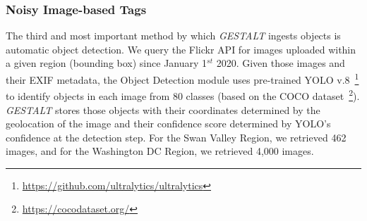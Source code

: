 \subsubsection{Noisy Image-based Tags}
The third and most important method by which \emph{GESTALT} ingests objects is automatic object detection.
We query the Flickr API for images uploaded within a given region (bounding box) since January 1$^{st}$ 2020. 
Given those images and their EXIF metadata, the Object Detection module uses pre-trained YOLO v.8~\footnote{\href{https://github.com/ultralytics/ultralytics}{https://github.com/ultralytics/ultralytics}} to identify objects in each image from 80 classes (based on the COCO dataset~\footnote{\href{{https://cocodataset.org/}}{https://cocodataset.org/}}). 
\emph{GESTALT} stores those objects with their coordinates determined by the geolocation of the image and their confidence score determined by YOLO's confidence at the detection step.
For the Swan Valley Region, we retrieved 462 images, and for the Washington DC Region, we retrieved 4,000 images.
